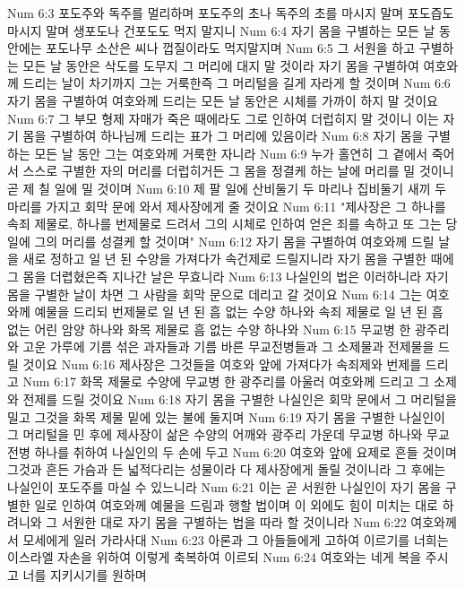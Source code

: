 Num 6:3  포도주와 독주를 멀리하며 포도주의 초나 독주의 초를 마시지 말며 포도즙도 마시지 말며 생포도나 건포도도 먹지 말지니
Num 6:4  자기 몸을 구별하는 모든 날 동안에는 포도나무 소산은 씨나 껍질이라도 먹지말지며
Num 6:5  그 서원을 하고 구별하는 모든 날 동안은 삭도를 도무지 그 머리에 대지 말 것이라 자기 몸을 구별하여 여호와께 드리는 날이 차기까지 그는 거룩한즉 그 머리털을 길게 자라게 할 것이며
Num 6:6  자기 몸을 구별하여 여호와께 드리는 모든 날 동안은 시체를 가까이 하지 말 것이요
Num 6:7  그 부모 형제 자매가 죽은 때에라도 그로 인하여 더럽히지 말 것이니 이는 자기 몸을 구별하여 하나님께 드리는 표가 그 머리에 있음이라
Num 6:8  자기 몸을 구별하는 모든 날 동안 그는 여호와께 거룩한 자니라
Num 6:9  누가 홀연히 그 곁에서 죽어서 스스로 구별한 자의 머리를 더럽히거든 그 몸을 정결케 하는 날에 머리를 밀 것이니 곧 제 칠 일에 밀 것이며
Num 6:10  제 팔 일에 산비둘기 두 마리나 집비둘기 새끼 두 마리를 가지고 회막 문에 와서 제사장에게 줄 것이요
Num 6:11  "제사장은 그 하나를 속죄 제물로, 하나를 번제물로 드려서 그의 시체로 인하여 얻은 죄를 속하고 또 그는 당일에 그의 머리를 성결케 할 것이며"
Num 6:12  자기 몸을 구별하여 여호와께 드릴 날을 새로 정하고 일 년 된 수양을 가져다가 속건제로 드릴지니라 자기 몸을 구별한 때에 그 몸을 더렵혔은즉 지나간 날은 무효니라
Num 6:13  나실인의 법은 이러하니라 자기 몸을 구별한 날이 차면 그 사람을 회막 문으로 데리고 갈 것이요
Num 6:14  그는 여호와께 예물을 드리되 번제물로 일 년 된 흠 없는 수양 하나와 속죄 제물로 일 년 된 흠 없는 어린 암양 하나와 화목 제물로 흠 없는 수양 하나와
Num 6:15  무교병 한 광주리와 고운 가루에 기름 섞은 과자들과 기름 바른 무교전병들과 그 소제물과 전제물을 드릴 것이요
Num 6:16  제사장은 그것들을 여호와 앞에 가져다가 속죄제와 번제를 드리고
Num 6:17  화목 제물로 수양에 무교병 한 광주리를 아울러 여호와께 드리고 그 소제와 전제를 드릴 것이요
Num 6:18  자기 몸을 구별한 나실인은 회막 문에서 그 머리털을 밀고 그것을 화목 제물 밑에 있는 불에 둘지며
Num 6:19  자기 몸을 구별한 나실인이 그 머리털을 민 후에 제사장이 삶은 수양의 어깨와 광주리 가운데 무교병 하나와 무교전병 하나를 취하여 나실인의 두 손에 두고
Num 6:20  여호와 앞에 요제로 흔들 것이며 그것과 흔든 가슴과 든 넓적다리는 성물이라 다 제사장에게 돌릴 것이니라 그 후에는 나실인이 포도주를 마실 수 있느니라
Num 6:21  이는 곧 서원한 나실인이 자기 몸을 구별한 일로 인하여 여호와께 예물을 드림과 행할 법이며 이 외에도 힘이 미치는 대로 하려니와 그 서원한 대로 자기 몸을 구별하는 법을 따라 할 것이니라
Num 6:22  여호와께서 모세에게 일러 가라사대
Num 6:23  아론과 그 아들들에게 고하여 이르기를 너희는 이스라엘 자손을 위하여 이렇게 축복하여 이르되
Num 6:24  여호와는 네게 복을 주시고 너를 지키시기를 원하며
